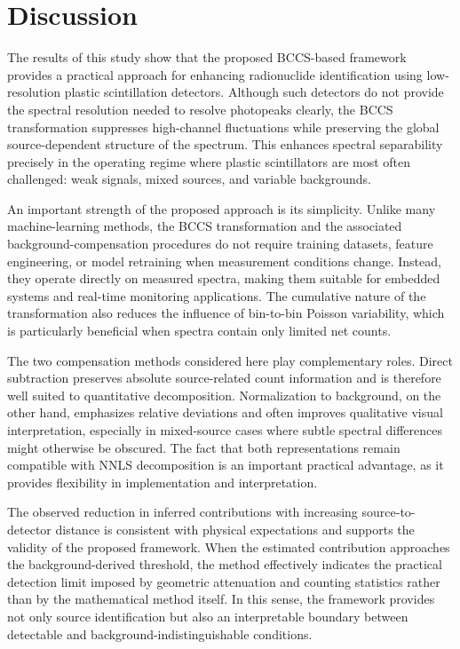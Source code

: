 \documentclass[pdflatex,sn-mathphys-num, table]{sn-jnl}%
\theoremstyle{thmstyleone}%
\theoremstyle{thmstyletwo}%
\theoremstyle{thmstylethree}%
\begin{document}
\section*{Discussion}

The results of this study show that the proposed BCCS-based framework provides a practical approach for enhancing radionuclide identification using low-resolution plastic scintillation detectors. Although such detectors do not provide the spectral resolution needed to resolve photopeaks clearly, the BCCS transformation suppresses high-channel fluctuations while preserving the global source-dependent structure of the spectrum. This enhances spectral separability precisely in the operating regime where plastic scintillators are most often challenged: weak signals, mixed sources, and variable backgrounds.

An important strength of the proposed approach is its simplicity. Unlike many machine-learning methods, the BCCS transformation and the associated background-compensation procedures do not require training datasets, feature engineering, or model retraining when measurement conditions change. Instead, they operate directly on measured spectra, making them suitable for embedded systems and real-time monitoring applications. The cumulative nature of the transformation also reduces the influence of bin-to-bin Poisson variability, which is particularly beneficial when spectra contain only limited net counts. 

The two compensation methods considered here play complementary roles. Direct subtraction preserves absolute source-related count information and is therefore well suited to quantitative decomposition. Normalization to background, on the other hand, emphasizes relative deviations and often improves qualitative visual interpretation, especially in mixed-source cases where subtle spectral differences might otherwise be obscured. The fact that both representations remain compatible with NNLS decomposition is an important practical advantage, as it provides flexibility in implementation and interpretation.

The observed reduction in inferred contributions with increasing source-to-detector distance is consistent with physical expectations and supports the validity of the proposed framework. When the estimated contribution approaches the background-derived threshold, the method effectively indicates the practical detection limit imposed by geometric attenuation and counting statistics rather than by the mathematical method itself. In this sense, the framework provides not only source identification but also an interpretable boundary between detectable and background-indistinguishable conditions.
\end{document}
